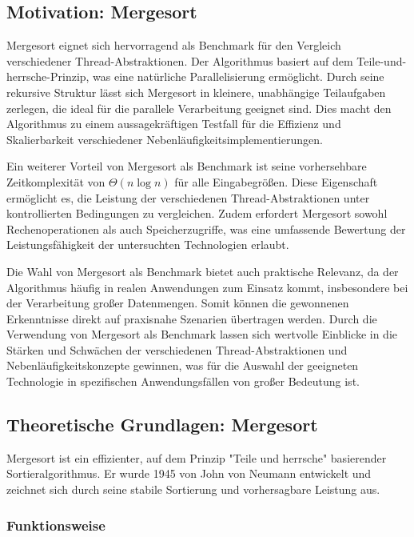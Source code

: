 \documentclass[fontsize=12pt,paper=a4,twoside=semi,parskip=half-,headsepline,headinclude]{scrreprt}
\begin{document}
\subsection{Motivation: Mergesort}
Mergesort eignet sich hervorragend als Benchmark für den Vergleich verschiedener Thread-Abstraktionen. Der Algorithmus basiert auf dem Teile-und-herrsche-Prinzip, was eine natürliche Parallelisierung ermöglicht. Durch seine rekursive Struktur lässt sich Mergesort in kleinere, unabhängige Teilaufgaben zerlegen, die ideal für die parallele Verarbeitung geeignet sind. Dies macht den Algorithmus zu einem aussagekräftigen Testfall für die Effizienz und Skalierbarkeit verschiedener Nebenläufigkeitsimplementierungen.

Ein weiterer Vorteil von Mergesort als Benchmark ist seine vorhersehbare Zeitkomplexität von $\Theta(n\log{}n)$ für alle Eingabegrößen. Diese Eigenschaft ermöglicht es, die Leistung der verschiedenen Thread-Abstraktionen unter kontrollierten Bedingungen zu vergleichen. Zudem erfordert Mergesort sowohl Rechenoperationen als auch Speicherzugriffe, was eine umfassende Bewertung der Leistungsfähigkeit der untersuchten Technologien erlaubt.

Die Wahl von Mergesort als Benchmark bietet auch praktische Relevanz, da der Algorithmus häufig in realen Anwendungen zum Einsatz kommt, insbesondere bei der Verarbeitung großer Datenmengen. Somit können die gewonnenen Erkenntnisse direkt auf praxisnahe Szenarien übertragen werden. Durch die Verwendung von Mergesort als Benchmark lassen sich wertvolle Einblicke in die Stärken und Schwächen der verschiedenen Thread-Abstraktionen und Nebenläufigkeitskonzepte gewinnen, was für die Auswahl der geeigneten Technologie in spezifischen Anwendungsfällen von großer Bedeutung ist.

\subsection{Theoretische Grundlagen: Mergesort}

Mergesort ist ein effizienter, auf dem Prinzip "Teile und herrsche" basierender Sortieralgorithmus. Er wurde 1945 von John von Neumann entwickelt und zeichnet sich durch seine stabile Sortierung und vorhersagbare Leistung aus.

\subsubsection{Funktionsweise}
\end{document}
